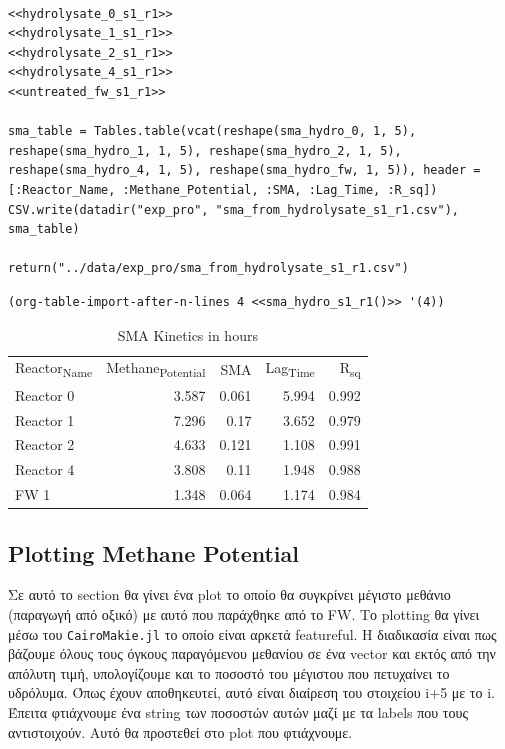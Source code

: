 \documentclass[11pt]{article}
\begin{document}
\begin{verbatim}

<<hydrolysate_0_s1_r1>>
<<hydrolysate_1_s1_r1>>
<<hydrolysate_2_s1_r1>>
<<hydrolysate_4_s1_r1>>
<<untreated_fw_s1_r1>>

sma_table = Tables.table(vcat(reshape(sma_hydro_0, 1, 5), reshape(sma_hydro_1, 1, 5), reshape(sma_hydro_2, 1, 5), reshape(sma_hydro_4, 1, 5), reshape(sma_hydro_fw, 1, 5)), header = [:Reactor_Name, :Methane_Potential, :SMA, :Lag_Time, :R_sq])
CSV.write(datadir("exp_pro", "sma_from_hydrolysate_s1_r1.csv"), sma_table)

return("../data/exp_pro/sma_from_hydrolysate_s1_r1.csv")
\end{verbatim}

\begin{verbatim}
(org-table-import-after-n-lines 4 <<sma_hydro_s1_r1()>> '(4))
\end{verbatim}

\begin{table}[htbp]
\caption{SMA Kinetics in hours}
\centering
\begin{tabular}{lrrrr}
Reactor\textsubscript{Name} & Methane\textsubscript{Potential} & SMA & Lag\textsubscript{Time} & R\textsubscript{sq}\\[0pt]
Reactor 0 & 3.587 & 0.061 & 5.994 & 0.992\\[0pt]
Reactor 1 & 7.296 & 0.17 & 3.652 & 0.979\\[0pt]
Reactor 2 & 4.633 & 0.121 & 1.108 & 0.991\\[0pt]
Reactor 4 & 3.808 & 0.11 & 1.948 & 0.988\\[0pt]
FW 1 & 1.348 & 0.064 & 1.174 & 0.984\\[0pt]
\end{tabular}
\end{table}

\subsection{Plotting Methane Potential}
\label{sec:org9a69fc2}
Σε αυτό το section θα γίνει ένα plot το οποίο θα συγκρίνει μέγιστο μεθάνιο (παραγωγή από οξικό) με αυτό που παράχθηκε από το FW. Το plotting θα γίνει μέσω του \texttt{CairoMakie.jl} το οποίο είναι αρκετά featureful. Η διαδικασία είναι πως βάζουμε όλους τους όγκους παραγόμενου μεθανίου σε ένα vector και εκτός από την απόλυτη τιμή, υπολογίζουμε και το ποσοστό του μέγιστου που πετυχαίνει το υδρόλυμα. Όπως έχουν αποθηκευτεί, αυτό είναι διαίρεση του στοιχείου i+5 με το i. Έπειτα φτιάχνουμε ένα string των ποσοστών αυτών μαζί με τα labels που τους αντιστοιχούν. Αυτό θα προστεθεί στο plot που φτιάχνουμε.
\end{document}
